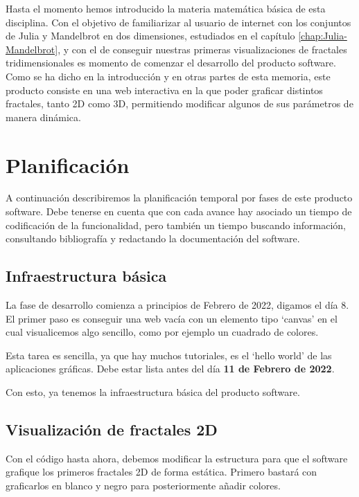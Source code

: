 %
%

Hasta el momento hemos introducido la materia matemática básica de esta disciplina. Con el objetivo de familiarizar al usuario de internet con los conjuntos de Julia y Mandelbrot en dos dimensiones, estudiados en el capítulo \ref{chap:Julia-Mandelbrot}, y con el de conseguir nuestras primeras visualizaciones de fractales tridimensionales es momento de comenzar el desarrollo del producto software. Como se ha dicho en la introducción y en otras partes de esta memoria, este producto consiste en una web interactiva en la que poder graficar distintos fractales, tanto 2D como 3D, permitiendo modificar algunos de sus parámetros de manera dinámica.  

\section*{Planificación}

A continuación describiremos la planificación temporal por fases de este producto software. Debe tenerse en cuenta que con cada avance hay asociado un tiempo de codificación de la funcionalidad, pero también un tiempo buscando información, consultando bibliografía y redactando la documentación del software.

\subsection*{Infraestructura básica}

La fase de desarrollo comienza a principios de Febrero de 2022, digamos el día 8. El primer paso es conseguir una web vacía con un elemento tipo `canvas' en el cual visualicemos algo sencillo, como por ejemplo un cuadrado de colores.

Esta tarea es sencilla, ya que hay muchos tutoriales, es el `hello world' de las aplicaciones gráficas. Debe estar lista antes del día \textbf{11 de Febrero de 2022}.

Con esto, ya tenemos la infraestructura básica del producto software.

\subsection*{Visualización de fractales 2D}

Con el código hasta ahora, debemos modificar la estructura para que el software grafique los primeros fractales 2D de forma estática. Primero bastará con graficarlos en blanco y negro para posteriormente añadir colores.

